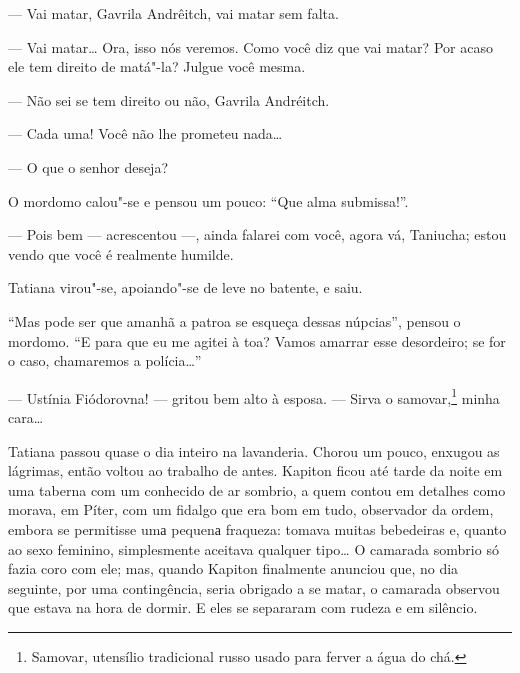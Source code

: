 --- Vai matar, Gavrila Andrêitch, vai matar sem falta.

--- Vai matar\ldots{} Ora, isso nós veremos. Como você diz que vai matar? Por
acaso ele tem direito de matá"-la? Julgue você mesma.

--- Não sei se tem direito ou não, Gavrila Andréitch.

--- Cada uma! Você não lhe prometeu nada\ldots{}

--- O que o senhor deseja?

O mordomo calou"-se e pensou um pouco: ``Que alma submissa!''.

--- Pois bem --- acrescentou ---, ainda falarei com você, agora vá,
Taniucha; estou vendo que você é realmente humilde.

Tatiana virou"-se, apoiando"-se de leve no batente, e saiu.

``Mas pode ser que amanhã a patroa se esqueça dessas núpcias'', pensou o
mordomo. ``E para que eu me agitei à toa? Vamos amarrar esse desordeiro;
se for o caso, chamaremos a polícia\ldots{}''

--- Ustínia Fiódorovna! --- gritou bem alto à esposa. --- Sirva o
samovar,\footnote{Samovar, utensílio tradicional russo usado para
  ferver a água do chá.} minha cara\ldots{}

Tatiana passou quase o dia inteiro na lavanderia. Chorou um pouco,
enxugou as lágrimas, então voltou ao trabalho de antes. Kapiton ficou
até tarde da noite em uma taberna com um conhecido de ar sombrio, a quem
contou em detalhes como morava, em Píter, com um fidalgo que era bom em
tudo, observador da ordem, embora se permitisse umа pequenа fraqueza:
tomava muitas bebedeiras e, quanto ao sexo feminino, simplesmente
aceitava qualquer tipo\ldots{} O camarada sombrio só fazia coro com ele; mas,
quando Kapiton finalmente anunciou que, no dia seguinte, por uma
contingência, seria obrigado a se matar, o camarada observou que estava
na hora de dormir. E eles se separaram com rudeza e em silêncio.


